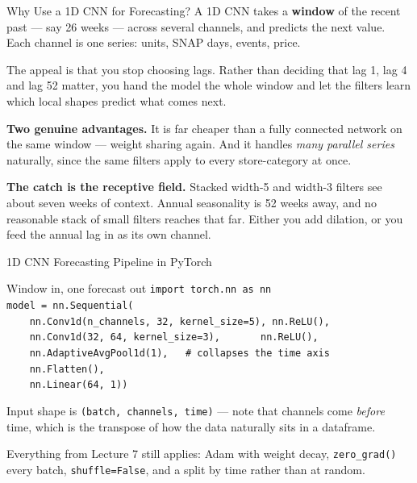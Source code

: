 \documentclass[aspectratio=169, 11pt]{beamer}
\begin{document}
\begin{frame}{Why Use a 1D CNN for Forecasting?}
  A 1D CNN takes a \textbf{window} of the recent past --- say 26 weeks --- across several
  channels, and predicts the next value. Each channel is one series: units, SNAP days, events,
  price.

  \vspace{0.15cm}
  The appeal is that you stop choosing lags. Rather than deciding that lag 1, lag 4 and lag 52
  matter, you hand the model the whole window and let the filters learn which local shapes
  predict what comes next.

  \begin{keybox}
    \textbf{Two genuine advantages.} It is far cheaper than a fully connected network on the same
    window --- weight sharing again. And it handles \emph{many parallel series} naturally, since
    the same filters apply to every store-category at once.
  \end{keybox}

  \vspace{0.1cm}
  \textbf{The catch is the receptive field.} Stacked width-5 and width-3 filters see about seven
  weeks of context. Annual seasonality is 52 weeks away, and no reasonable stack of small filters
  reaches that far. Either you add dilation, or you feed the annual lag in as its own channel.
\end{frame}

\begin{frame}{1D CNN Forecasting Pipeline in PyTorch}
  \begin{examplebox}{Window in, one forecast out}
    {\tiny\linespread{1.2}\selectfont
    \texttt{import torch.nn as nn}\\[2pt]
    \texttt{model = nn.Sequential(}\\
    \texttt{\ \ \ \ nn.Conv1d(n\_channels, 32, kernel\_size=5), nn.ReLU(),}\\
    \texttt{\ \ \ \ nn.Conv1d(32, 64, kernel\_size=3),\ \ \ \ \ \ \ nn.ReLU(),}\\
    \texttt{\ \ \ \ nn.AdaptiveAvgPool1d(1),\ \ \ \# collapses the time axis}\\
    \texttt{\ \ \ \ nn.Flatten(),}\\
    \texttt{\ \ \ \ nn.Linear(64, 1))}
    }
  \end{examplebox}
  Input shape is \texttt{(batch, channels, time)} --- note that channels come \emph{before} time,
  which is the transpose of how the data naturally sits in a dataframe.

  \vspace{0.15cm}
  Everything from Lecture 7 still applies: Adam with weight decay, \texttt{zero\_grad()} every
  batch, \texttt{shuffle=False}, and a split by time rather than at random.

  \vspace{0.1cm}
\end{frame}
\end{document}
